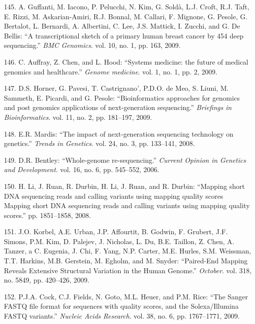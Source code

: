 \documentclass[12pt,a4paper,twoside]{ugathesis}
\theoremstyle{definition}
\theoremstyle{definition}
\theoremstyle{definition}
\theoremstyle{remark}
\begin{document}
\hypertarget{ref-Guffanti2009}{}
145. A. Guffanti, M. Iacono, P. Pelucchi, N. Kim, G. Soldà, L.J. Croft,
R.J. Taft, E. Rizzi, M. Askarian-Amiri, R.J. Bonnal, M. Callari, F.
Mignone, G. Pesole, G. Bertalot, L. Bernardi, A. Albertini, C. Lee, J.S.
Mattick, I. Zucchi, and G. De Bellis: ``A transcriptional sketch of a
primary human breast cancer by 454 deep sequencing.'' \emph{BMC
Genomics}. vol. 10, no. 1, pp. 163, 2009.

\hypertarget{ref-Auffray2009}{}
146. C. Auffray, Z. Chen, and L. Hood: ``Systems medicine: the future of
medical genomics and healthcare.'' \emph{Genome medicine}. vol. 1, no.
1, pp. 2, 2009.

\hypertarget{ref-Horner2009}{}
147. D.S. Horner, G. Pavesi, T. Castrignano', P.D.O. de Meo, S. Liuni,
M. Sammeth, E. Picardi, and G. Pesole: ``Bioinformatics approaches for
genomics and post genomics applications of next-generation sequencing.''
\emph{Briefings in Bioinformatics}. vol. 11, no. 2, pp. 181--197, 2009.

\hypertarget{ref-Mardis2008}{}
148. E.R. Mardis: ``The impact of next-generation sequencing technology
on genetics.'' \emph{Trends in Genetics}. vol. 24, no. 3, pp. 133--141,
2008.

\hypertarget{ref-Bentley2006}{}
149. D.R. Bentley: ``Whole-genome re-sequencing.'' \emph{Current Opinion
in Genetics and Development}. vol. 16, no. 6, pp. 545--552, 2006.

\hypertarget{ref-Li2008}{}
150. H. Li, J. Ruan, R. Durbin, H. Li, J. Ruan, and R. Durbin: ``Mapping
short DNA sequencing reads and calling variants using mapping quality
scores Mapping short DNA sequencing reads and calling variants using
mapping quality scores.'' pp. 1851--1858, 2008.

\hypertarget{ref-Korbel2009}{}
151. J.O. Korbel, A.E. Urban, J.P. Affourtit, B. Godwin, F. Grubert,
J.F. Simons, P.M. Kim, D. Palejev, J. Nicholas, L. Du, B.E. Taillon, Z.
Chen, A. Tanzer, a C. Eugenia, J. Chi, F. Yang, N.P. Carter, M.E.
Hurles, S.M. Weissman, T.T. Harkins, M.B. Gerstein, M. Egholm, and M.
Snyder: ``Paired-End Mapping Reveals Extensive Structural Variation in
the Human Genome.'' \emph{October}. vol. 318, no. 5849, pp. 420--426,
2009.

\hypertarget{ref-Cock2009}{}
152. P.J.A. Cock, C.J. Fields, N. Goto, M.L. Heuer, and P.M. Rice: ``The
Sanger FASTQ file format for sequences with quality scores, and the
Solexa/Illumina FASTQ variants.'' \emph{Nucleic Acids Research}. vol.
38, no. 6, pp. 1767--1771, 2009.
\end{document}
